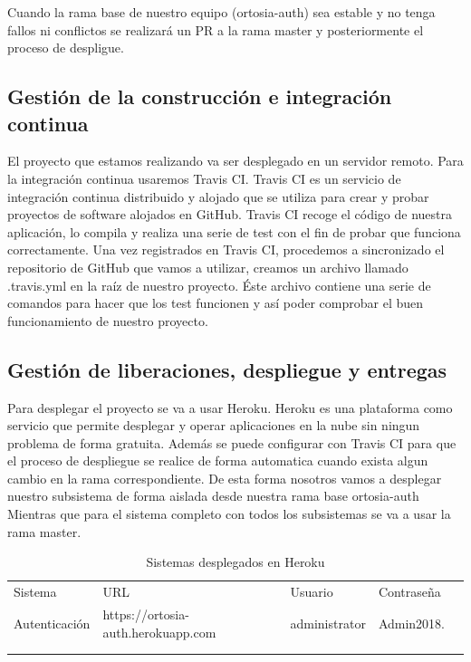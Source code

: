 \documentclass[12pt]{article}
\begin{document}
Cuando la rama base de nuestro equipo (ortosia-auth) sea estable y no tenga  fallos ni conflictos se realizará un PR a la rama master y posteriormente el proceso de despligue. 



\subsection{Gestión de la construcción e integración continua}
El proyecto que estamos realizando va ser desplegado en un servidor remoto. Para la integración continua usaremos Travis CI.
Travis CI es un servicio de integración continua distribuido y alojado que se utiliza para crear y probar proyectos de software alojados en GitHub. Travis CI recoge el código de nuestra aplicación, lo compila y realiza una serie de test con el fin de probar que funciona correctamente.
Una vez registrados en Travis CI, procedemos a sincronizado el repositorio de GitHub que vamos a utilizar, creamos un archivo llamado .travis.yml en la raíz de nuestro proyecto. Éste archivo contiene una serie de comandos para hacer que los test funcionen y así poder comprobar el buen funcionamiento de nuestro proyecto.

\subsection{Gestión de liberaciones, despliegue y entregas}

Para desplegar el proyecto se va a usar Heroku. Heroku es una plataforma como servicio que permite desplegar y operar aplicaciones en la nube sin ningun problema de forma gratuita.
Además se puede configurar con Travis CI para que el proceso de despliegue se realice de forma automatica cuando exista algun cambio en la rama correspondiente. De esta forma nosotros vamos a desplegar nuestro subsistema de forma aislada desde nuestra rama base ortosia-auth
Mientras que para el sistema completo con todos los subsistemas se va a usar la rama master.

\begin{table}[H]
\begin{tabular}{lllll}
\cline{1-4}
\multicolumn{1}{|l|}{Sistema} & \multicolumn{1}{l|}{URL} & \multicolumn{1}{l|}{Usuario} & \multicolumn{1}{l|}{Contraseña} &  \\ \cline{1-4}
\multicolumn{1}{|l|}{Autenticación} & \multicolumn{1}{l|}{https://ortosia-auth.herokuapp.com} & \multicolumn{1}{l|}{administrator} & \multicolumn{1}{l|}{Admin2018.} &  \\ \cline{1-4}
\multicolumn{1}{|l|}{} & \multicolumn{1}{l|}{} & \multicolumn{1}{l|}{} & \multicolumn{1}{l|}{} &  \\ \cline{1-4}
                       &                       &                       &                       & 
\end{tabular}
\caption{Sistemas desplegados en Heroku}
\end{table}
\end{document}

